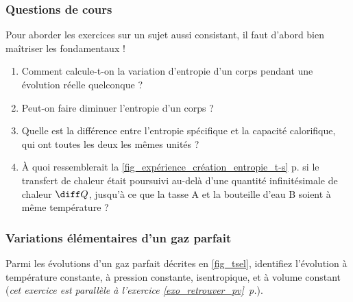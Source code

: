 \begin{boiboiboite}
	\propeau
	\propair
	\isentropiques
	\deltaentropie
	\efficacitescarnot
\end{boiboiboite}


\subsubsection{Questions de cours}
\label{exo_questions_cours}
	
	Pour aborder les exercices sur un sujet aussi consistant, il faut d’abord bien maîtriser les fondamentaux !

	\begin{enumerate}
		\item Comment calcule-t-on la variation d’entropie d’un corps pendant une évolution réelle quelconque ?
		\item Peut-on faire diminuer l’entropie d’un corps ?
		\item Quelle est la différence entre l’entropie spécifique et la capacité calorifique, qui ont toutes les deux les mêmes unités ?
		\item À quoi ressemblerait la \cref{fig_expérience_création_entropie_t-s} p.\pageref{fig_expérience_création_entropie_t-s} si le transfert de chaleur était poursuivi au-delà d’une quantité infinitésimale de chaleur $\diff Q$, jusqu’à ce que la tasse A et la bouteille d’eau B soient à même température ?
	\end{enumerate}

\subsubsection{Variations élémentaires d’un gaz parfait}
\label{exo_ts_variations_elementaires}

	Parmi les évolutions d’un gaz parfait décrites en \cref{fig_tsel}, identifiez l’évolution à température constante, à pression constante, isentropique, et à volume constant (\textit{cet exercice est parallèle à l’exercice \ref{exo_retrouver_pv}~p.\pageref{exo_retrouver_pv}}).
	
